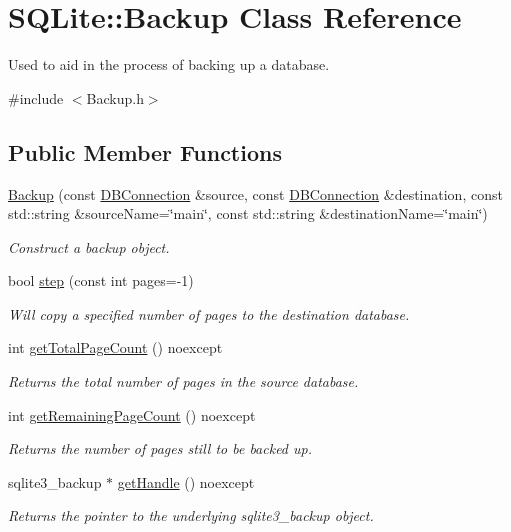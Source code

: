 \hypertarget{a00001}{\section{S\-Q\-Lite\-:\-:Backup Class Reference}
\label{a00001}
}


Used to aid in the process of backing up a database.  




{\ttfamily \#include $<$Backup.\-h$>$}

\subsection*{Public Member Functions}
\begin{DoxyCompactItemize}
\item 
\hyperlink{a00001_a363301d27d042970ce86c2487d33351c}{Backup} (const \hyperlink{a00004}{D\-B\-Connection} \&source, const \hyperlink{a00004}{D\-B\-Connection} \&destination, const std\-::string \&source\-Name=\char`\"{}main\char`\"{}, const std\-::string \&destination\-Name=\char`\"{}main\char`\"{})
\begin{DoxyCompactList}\small\item\em Construct a backup object. \end{DoxyCompactList}\item 
bool \hyperlink{a00001_a6ec2f5a0d8db598c15311437c4b9aa43}{step} (const int pages=-\/1)
\begin{DoxyCompactList}\small\item\em Will copy a specified number of pages to the destination database. \end{DoxyCompactList}\item 
int \hyperlink{a00001_a83fc69146f90276d5ccfe308e054c25b}{get\-Total\-Page\-Count} () noexcept
\begin{DoxyCompactList}\small\item\em Returns the total number of pages in the source database. \end{DoxyCompactList}\item 
int \hyperlink{a00001_a5cb7d3bfbe87c8fe07b4eca01f6b04aa}{get\-Remaining\-Page\-Count} () noexcept
\begin{DoxyCompactList}\small\item\em Returns the number of pages still to be backed up. \end{DoxyCompactList}\item 
\hypertarget{a00001_a65c099db1b55215c85f962fdc33d2f21}{sqlite3\-\_\-backup $\ast$ \hyperlink{a00001_a65c099db1b55215c85f962fdc33d2f21}{get\-Handle} () noexcept}\label{a00001_a65c099db1b55215c85f962fdc33d2f21}

\begin{DoxyCompactList}\small\item\em Returns the pointer to the underlying sqlite3\-\_\-backup object. \end{DoxyCompactList}\end{DoxyCompactItemize}


